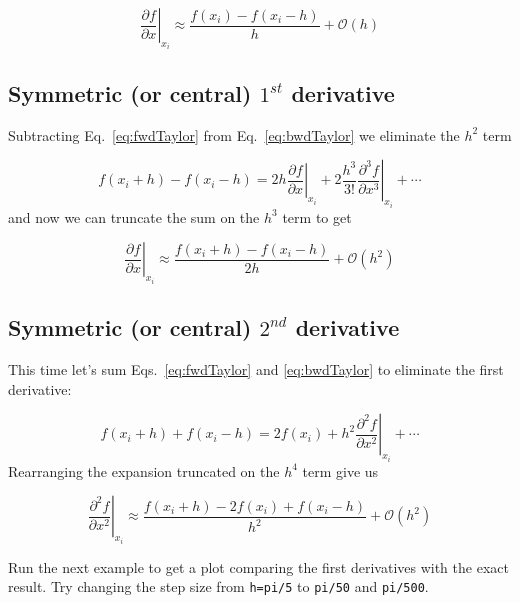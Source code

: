 \begin{equation}
 \left.\dfrac{\partial f}{\partial x}\right|_{x_i} \approx \dfrac{f(x_i) - f(x_i-h)}{h} + \mathcal{O}(h)
\end{equation}

\subsection*{Symmetric (or central) $1^{st}$ derivative}

Subtracting Eq.~\eqref{eq:fwdTaylor} from Eq.~\eqref{eq:bwdTaylor} we eliminate the $h^2$ term

\begin{equation}
 f(x_i+h) - f(x_i-h) = 2h \left.\dfrac{\partial f}{\partial x}\right|_{x_i} + 2\dfrac{h^3}{3!}\left.\dfrac{\partial^3 f}{\partial x^3}\right|_{x_i} + \cdots
\end{equation}
and now we can truncate the sum on the $h^3$ term to get

\begin{equation}
 \left.\dfrac{\partial f}{\partial x}\right|_{x_i} \approx \dfrac{f(x_i+h) - f(x_i-h)}{2h} + \mathcal{O}(h^2)
\end{equation}


\subsection*{Symmetric (or central) $2^{nd}$ derivative}

This time let's sum Eqs.~\eqref{eq:fwdTaylor} and \eqref{eq:bwdTaylor} to eliminate the first derivative:

\begin{equation}
 f(x_i+h) + f(x_i-h) = 2f(x_i) + h^2\left.\dfrac{\partial^2 f}{\partial x^2}\right|_{x_i} + \cdots
\end{equation}
Rearranging the expansion truncated on the $h^4$ term give us

\begin{equation}
 \left.\dfrac{\partial^2 f}{\partial x^2}\right|_{x_i} \approx \dfrac{f(x_i+h) - 2f(x_i) + f(x_i-h)}{h^2} + \mathcal{O}(h^2)
\end{equation}

Run the next example to get a plot comparing the first derivatives with the exact result. Try changing the step size from \texttt{h=pi/5} to \texttt{pi/50} and \texttt{pi/500}.

